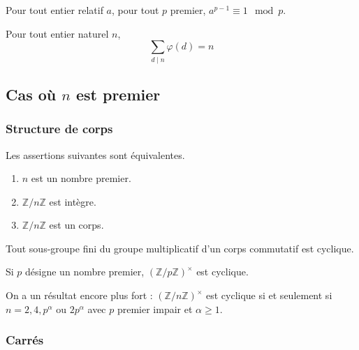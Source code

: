   \begin{proposition}
    Pour tout entier relatif $a$, pour tout $p$ premier, $a^{p-1} \equiv 1 \mod p$.
  \end{proposition}

  \begin{proposition}
    Pour tout entier naturel $n$,
    \[ \sum_{d \mid n} \varphi(d) = n \]
  \end{proposition}

  \subsection{Cas où \texorpdfstring{$n$}{n} est premier}

  \subsubsection{Structure de corps}

  \begin{proposition}
    Les assertions suivantes sont équivalentes.
    \begin{enumerate}[label=(\roman*)]
      \item $n$ est un nombre premier.
      \item $\mathbb{Z}/n\mathbb{Z}$ est intègre.
      \item $\mathbb{Z}/n\mathbb{Z}$ est un corps.
    \end{enumerate}
  \end{proposition}


  \begin{theorem}
    Tout sous-groupe fini du groupe multiplicatif d'un corps commutatif est cyclique.
  \end{theorem}

  \begin{corollary}
    Si $p$ désigne un nombre premier, $(\mathbb{Z}/p\mathbb{Z})^\times$ est cyclique.
  \end{corollary}


  \begin{remark}
    On a un résultat encore plus fort : $(\mathbb{Z}/n\mathbb{Z})^\times$ est cyclique si et seulement si $n = 2, 4, p^\alpha \text{ ou } 2p^\alpha$ avec $p$ premier impair et $\alpha \geq 1$.
  \end{remark}

  \subsubsection{Carrés}

